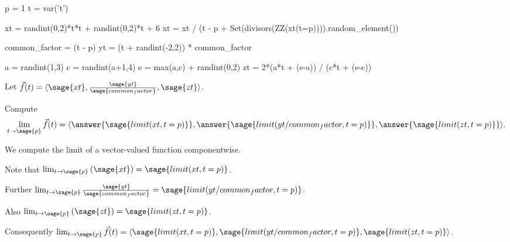 \documentclass{ximera}
\author{Jim Fowler}
\begin{document}
\makerandom

\begin{sagesilent}
  p = 1
  t = var('t')
  
  xt = randint(0,2)*t*t + randint(0,2)*t + 6
  xt = xt / (t - p + Set(divisors(ZZ(xt(t=p)))).random_element())

  common_factor = (t - p)
  yt = (t + randint(-2,2)) * common_factor

  a = randint(1,3)
  c = randint(a+1,4)
  e = max(a,c) + randint(0,2)
  zt = 2*(a*t + (e-a)) / (c*t + (e-c))
\end{sagesilent}

\begin{exercise}

  Let $\vec{f}(t) = \langle \sage{xt}, \frac{\sage{yt}}{\sage{common_factor}}, \sage{zt} \rangle$.

  Compute
  \[
    \lim_{t \to \sage{p}} \vec{f}(t) = \langle \answer{\sage{limit(xt,t=p)}}, \answer{\sage{limit(yt/common_factor,t=p)}}, \answer{\sage{limit(zt,t=p)}} \rangle.
  \]
  
  \begin{hint}
    We compute the limit of a vector-valued function componentwise.
  \end{hint}

  \begin{hint}
    Note that $\lim_{t \to \sage{p}} \left( \sage{xt} \right) = \sage{limit(xt,t=p)}$.
  \end{hint}

  \begin{hint}
    Further $\lim_{t \to \sage{p}} \frac{\sage{yt}}{\sage{common_factor}} = \sage{limit(yt/common_factor,t=p)}$.
  \end{hint}

  \begin{hint}
    Also $\lim_{t \to \sage{p}} \left( \sage{zt} \right) = \sage{limit(zt,t=p)}$.
  \end{hint}
  
  \begin{hint}
    Consequently $\lim_{t \to \sage{p}} \vec{f}(t) = \langle \sage{limit(xt,t=p)}, \sage{limit(yt/common_factor,t=p)}, \sage{limit(zt,t=p)} \rangle$.
  \end{hint}          
  
\end{exercise}
\end{document}
